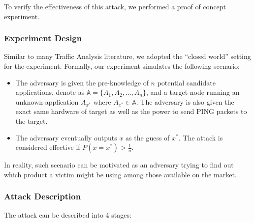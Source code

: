 To verify the effectiveness of this attack, we performed a proof of concept experiment.



\subsubsection{Experiment Design}

Similar to many Traffic Analysis literature, we adopted the ``closed world'' setting for the experiment. Formally, our experiment simulates the following scenario:
\begin{itemize}
 \item The adversary is given the pre-knowledge of $n$ potential candidate applications, denote as $\mathbb{A} = \{A_1, A_2, ..., A_n\}$, and a target node running an unknown application $A_{x^*}$ where $A_{x^*} \in \mathbb{A}$. The adversary is also given the exact same hardware of target as well as the power to send PING packets to the target.
 \item The adversary eventually outputs $x$ as the guess of $x^*$. The attack is considered effective if $P(x = x^*) > \frac{1}{n}$.
\end{itemize}

In reality, such scenario can be motivated as an adversary trying to find out which product a victim might be using among those available on the market.

\subsubsection{Attack Description}

The attack can be described into 4 stages:

